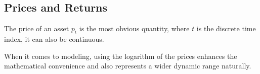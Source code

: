 \subsection{Prices and Returns}

The price of an asset $p_t$ is the most obvious quantity, where $t$ is the discrete time index, it can also be continuous.

When it comes to modeling, using the logarithm of the prices enhances the mathematical convenience and also represents a wider dynamic range naturally.



